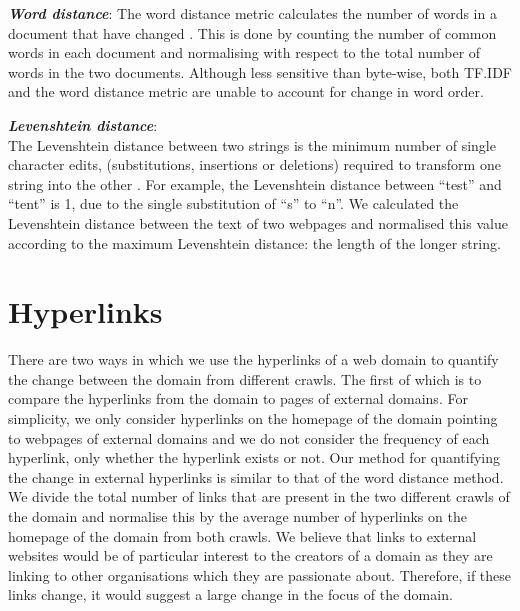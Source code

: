 \documentclass[10pt, a4paper]{article}
\begin{document}
\vspace{1.5mm}
\noindent \textit{\textbf{Word distance}}:
 The word distance metric calculates the number of words in a document that have changed \cite{ntoulas2004s}.
 This is done by counting the number of common words in each document and normalising with respect to the total number of words in the two documents.
 Although less sensitive than byte-wise, both TF.IDF and the word distance metric are unable to account for change in word order. 

\vspace{1.5mm}
\noindent \textit{\textbf{Levenshtein distance}}:\\
 The Levenshtein distance between two strings is the minimum number of single character edits, (substitutions, insertions or deletions) required to transform one string into the other \cite{levenshtein1996}.
 For example, the Levenshtein distance between ``test'' and ``tent'' is 1, due to the single substitution of ``s'' to ``n''.
 We calculated the Levenshtein distance between the text of two webpages and normalised this value according to the maximum Levenshtein distance: the length of the longer string. 
\vspace{-3mm}

\section{Hyperlinks}
\label{sec:links}
\vspace{-2mm}
 There are two ways in which we use the hyperlinks of a web domain to quantify the change between the domain from different crawls.
 The first of which is to compare the hyperlinks from the domain to pages of external domains.
 For simplicity, we only consider hyperlinks on the homepage of the domain pointing to webpages of external domains and we do not consider the frequency of each hyperlink, only whether the hyperlink exists or not.
 Our method for quantifying the change in external hyperlinks is similar to that of the word distance method.
 We divide the total number of links that are present in the two different crawls of the domain and normalise this by the average number of hyperlinks on the homepage of the domain from both crawls.
 We believe that links to external websites would be of particular interest to the creators of a domain as they are linking to other organisations which they are passionate about.
 Therefore, if these links change, it would suggest a large change in the focus of the domain.
 
\end{document}
